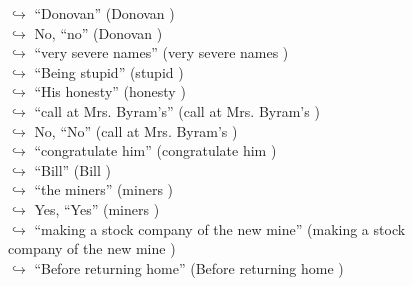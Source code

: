 \documentclass[11pt,a4paper, onecolumn]{article}
\begin{document}
\begin{figure}[t] \small \begin{tcolorbox}[boxsep=0pt,left=5pt,right=0pt,top=2pt,colback = yellow!5] \begin{dialogue}
 \small 
\colorbox{pink!25}{$\hookrightarrow$}
{ ``Donovan'' (Donovan ) }
\\
\colorbox{pink!25}{$\hookrightarrow$}
\colorbox{red!25}{No,}
{ ``no'' (Donovan ) }
\\
\colorbox{pink!25}{$\hookrightarrow$}
{ ``very severe names'' (very severe names ) }
\\
\colorbox{pink!25}{$\hookrightarrow$}
{ ``Being stupid'' (stupid ) }
\\
\colorbox{pink!25}{$\hookrightarrow$}
{ ``His honesty'' (honesty ) }
\\
\colorbox{pink!25}{$\hookrightarrow$}
{ ``call at Mrs. Byram's'' (call at Mrs. Byram's ) }
\\
\colorbox{pink!25}{$\hookrightarrow$}
\colorbox{red!25}{No,}
{ ``No'' (call at Mrs. Byram's ) }
\\
\colorbox{pink!25}{$\hookrightarrow$}
{ ``congratulate him'' (congratulate him ) }
\\
\colorbox{pink!25}{$\hookrightarrow$}
{ ``Bill'' (Bill ) }
\\
\colorbox{pink!25}{$\hookrightarrow$}
{ ``the miners'' (miners ) }
\\
\colorbox{pink!25}{$\hookrightarrow$}
\colorbox{red!25}{Yes,}
{ ``Yes'' (miners ) }
\\
\colorbox{pink!25}{$\hookrightarrow$}
{ ``making a stock company of the new mine'' (making a stock company of the new mine ) }
\\
\colorbox{pink!25}{$\hookrightarrow$}
{ ``Before returning home'' (Before returning home ) }

\end{dialogue}
\end{tcolorbox}
\end{figure}
\end{document}
